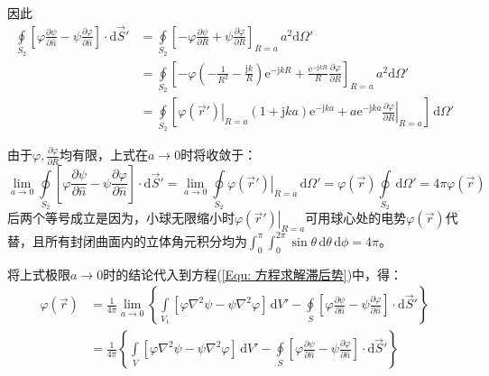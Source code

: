         因此
        \begin{equation*}
            \begin{aligned}
                \oint\limits_{S_2} \left[\varphi \frac{\partial \psi}{\partial \hat{n}}-\psi \frac{\partial \varphi}{\partial \hat{n}}\right]\cdot\mathrm{d}\vec{S}'
                &=\oint\limits_{S_2} \left[-\varphi \frac{\partial \psi}{\partial R}+\psi \frac{\partial \varphi}{\partial R}\right]_{R=a} \,a^2\mathrm{d}\varOmega'\\
                &=\oint\limits_{S_2} \left[-\varphi \left(-\frac{1}{R^2}-\frac{\mathrm{j}k}{R}\right)\mathrm{e}^{-\mathrm{j}k R}+ \frac{\mathrm{e}^{-\mathrm{j}kR}}{R} \frac{\partial \varphi}{\partial R}\right]_{R=a} \,a^2\mathrm{d}\varOmega'\\
                &=\oint\limits_{S_2} \left[\left.\varphi(\vec{r}')\right\vert_{R=a} \left(1+\mathrm{j}ka\right)\mathrm{e}^{-\mathrm{j}ka}+ a\mathrm{e}^{-\mathrm{j}ka}\left.\frac{\partial \varphi}{\partial R}\right\vert_{R=a}\right] \,\mathrm{d}\varOmega'
            \end{aligned}
        \end{equation*}

        由于$\varphi, \frac{\partial \varphi}{\partial R}$均有限，上式在$a\rightarrow 0$时将收敛于：
        \begin{equation*}
            \lim_{a \to 0}{\oint\limits_{S_2} \left[\varphi \frac{\partial \psi}{\partial \hat{n}}-\psi \frac{\partial \varphi}{\partial \hat{n}}\right]\cdot\mathrm{d}\vec{S}'}
            =\lim_{a \to 0}{\oint\limits_{S_2}\left.\varphi(\vec{r}')\right\vert_{R=a}\,\mathrm{d}\varOmega'}
            =\varphi(\vec{r})\oint\limits_{S_2}\,\mathrm{d}\varOmega'
            =4\pi\varphi(\vec{r})
        \end{equation*}
        后两个等号成立是因为，小球无限缩小时$\left.\varphi(\vec{r}')\right\vert_{R=a}$可用球心处的电势$\varphi(\vec{r})$代替，且所有封闭曲面内的立体角元积分均为$\int_{0}^{\pi}\int_{0}^{2\pi}\sin\theta \,\mathrm{d}\theta \,\mathrm{d}\phi=4\pi$。

        将上式极限$a\rightarrow 0$时的结论代入到方程(\eqref{Equ: 方程求解滞后势})中，得：
        \begin{equation}
            \begin{aligned}
                \varphi(\vec{r})
                &=\frac{1}{4\pi}\lim_{a \to 0}\left\{\int\limits_{V_1}\left[\varphi \nabla^2\psi-\psi \nabla^2 \varphi\right]\,\mathrm{d}V'
                -\oint\limits_{S} \left[\varphi \frac{\partial \psi}{\partial \hat{n}}-\psi \frac{\partial \varphi}{\partial \hat{n}}\right]\cdot\mathrm{d}\vec{S}'\right\}\\
                &=\frac{1}{4\pi}\left\{\int\limits_{V}\left[\varphi \nabla^2\psi-\psi \nabla^2 \varphi\right]\,\mathrm{d}V'
                -\oint\limits_{S} \left[\varphi \frac{\partial \psi}{\partial \hat{n}}-\psi \frac{\partial \varphi}{\partial \hat{n}}\right]\cdot\mathrm{d}\vec{S}'\right\}\\
            \end{aligned}
        \end{equation}

